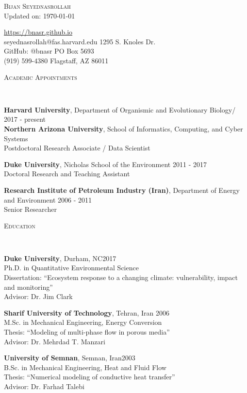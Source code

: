 \documentclass[10pt]{article}
\makeatletter
\newenvironment{changemargin}[2]{%
  \begin{list}{}{%
 \setlength{\topsep}{0pt}%
 \setlength{\leftmargin}{#1}%
 \setlength{\rightmargin}{#2}%
 \setlength{\listparindent}{\parindent}%
 \setlength{\itemindent}{\parindent}%
 \setlength{\parsep}{\parskip}%
  }%
  \item[]}{\end{list}
}
\newcommand{\lineover}{
  \begin{changemargin}{-0.05in}{-0.05in}
  \vspace*{-8pt}
  \hrulefill \\
  \vspace*{-2pt}
  \end{changemargin}
}
\newcommand{\header}[1]{
  \begin{changemargin}{-0.5in}{-0.5in}
  \scshape{#1}\\
  \lineover
  \end{changemargin}
}
\newcommand{\contact}[9]{
  \begin{changemargin}{-0.5in}{-0.5in}
  \begin{flushleft}
  
  {\huge \scshape {#1}}\\ 
  
  \bigskip
  {Updated on: #2}\medskip
  
  \url{#3} \\
  {#4} \hfill{#5}\\
  GitHub: @{#6} \hfill{#7}\\
  {#8} \hfill{#9}\\
  
  \end{flushleft}
  \medskip
  \end{changemargin}
}
\newenvironment{body} {
  \vspace*{-2pt}
  \begin{changemargin}{-0.5in}{-0.5in}
}
{\end{changemargin}
}
\makeatother
\begin{document}
\contact{Bijan Seyednasrollah}{\today}
{https://bnasr.github.io}
{seyednasrollah@fas.harvard.edu}{1295 S. Knoles Dr.}
{bnasr}{PO Box 5693}
{(919) 599-4380}{Flagstaff, AZ 86011}



\medskip
\medskip

\newcommand{\thedate}{\today}
\header{Academic Appointments}

\begin{body}

  \textbf{Harvard University}, Department of Organismic and Evolutionary Biology/  \hfill {2017 - present}\\
  \textbf{Northern Arizona University}, School of Informatics, Computing, and Cyber Systems\\
  Postdoctoral Research Associate / Data Scientist
  \medskip

  \textbf{Duke University}, Nicholas School of the Environment \hfill {2011 - 2017}\\
  Doctoral Research and Teaching Assistant
  \medskip

  \textbf{Research Institute of Petroleum Industry (Iran)}, Department of Energy and Environment \hfill {2006 - 2011}\\
  Senior Researcher
  \medskip

\end{body}
\medskip

\header{Education}

\begin{body}

  \textbf{Duke University}, Durham, NC\hfill {2017} \\
  {Ph.D. in Quantitative Environmental Science}\\
  Dissertation: ``Ecosystem response to a changing climate: vulnerability, impact and monitoring''\\
  Advisor: Dr. Jim Clark\\
  \medskip

  \textbf{Sharif University of Technology}, Tehran, Iran \hfill {2006} \\
  M.Sc. in Mechanical Engineering, Energy Conversion\\
  Thesis: ``Modeling of multi-phase flow in porous media''\\
  Advisor: Dr. Mehrdad T. Manzari\\
  \medskip

  \textbf{University of Semnan}, Semnan, Iran\hfill {2003} \\
  {B.Sc. in Mechanical Engineering, Heat and Fluid Flow} \\
  Thesis: ``Numerical modeling of conductive heat transfer''\\
  Advisor: Dr. Farhad Talebi\\
  \medskip

\end{body}
\end{document}

